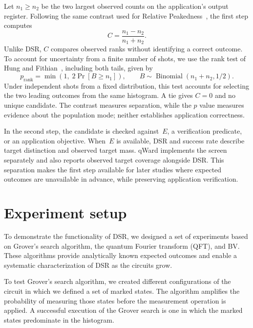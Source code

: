 \documentclass[pdflatex,sn-mathphys-num]{sn-jnl}
\theoremstyle{thmstyleone}%
\theoremstyle{thmstyletwo}%
\theoremstyle{thmstylethree}%
\begin{document}
Let $n_1\geq n_2$ be the two largest observed counts on the application's output register. Following the same contrast used for Relative Peakedness~\cite{briegerPeakedRandomCircuits_2026}, the first step computes
\begin{equation}
\label{eq:screen_contrast}
C=\frac{n_1-n_2}{n_1+n_2}.
\end{equation}
Unlike DSR, $C$ compares observed ranks without identifying a correct outcome. To account for uncertainty from a finite number of shots, we use the rank test of Hung and Fithian~\cite{hungRankVerification_2019}, including both tails, given by
\begin{equation}
\label{eq:rank_test}
p_{\mathrm{rank}}=\min\!\left(1,\;2\Pr[B\geq n_1]\right),
\qquad B\sim\operatorname{Binomial}(n_1+n_2,1/2).
\end{equation}
Under independent shots from a fixed distribution, this test accounts for selecting the two leading outcomes from the same histogram. A tie gives $C=0$ and no unique candidate. The contrast measures separation, while the $p$ value measures evidence about the population mode; neither establishes application correctness.

In the second step, the candidate is checked against~$E$, a verification predicate, or an application objective. When~$E$ is available, DSR and success rate describe target distinction and observed target mass. qWard implements the screen separately and also reports observed target coverage alongside DSR. This separation makes the first step available for later studies where expected outcomes are unavailable in advance, while preserving application verification.

\FloatBarrier
\section{Experiment setup}\label{subsec:experiment}

To demonstrate the functionality of DSR, we designed a set of experiments based on Grover's search algorithm, the quantum Fourier transform (QFT), and BV. These algorithms provide analytically known expected outcomes and enable a systematic characterization of DSR as the circuits grow.

To test Grover's search algorithm, we created different configurations of the circuit in which we defined a set of marked states. The algorithm amplifies the probability of measuring those states before the measurement operation is applied. A successful execution of the Grover search is one in which the marked states predominate in the histogram.
\end{document}
